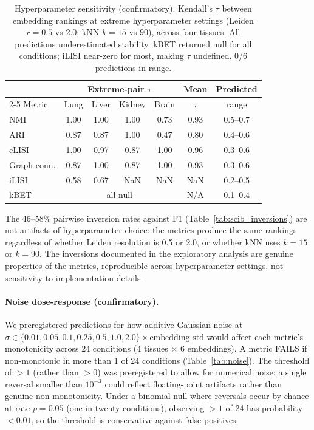 \documentclass[10pt,letterpaper]{article}
\begin{document}
\begin{table}[t]
\centering
\caption{Hyperparameter sensitivity (confirmatory). Kendall's $\tau$ between embedding rankings at extreme hyperparameter settings (Leiden $r = 0.5$ vs $2.0$; kNN $k = 15$ vs $90$), across four tissues. All predictions underestimated stability. kBET returned null for all conditions; iLISI near-zero for most, making $\tau$ undefined. 0/6 predictions in range.}
\label{tab:hyperparam}
\small
\begin{tabular}{@{}lcccccc@{}}
\toprule
 & \multicolumn{4}{c}{Extreme-pair $\tau$} & Mean & Predicted \\
\cmidrule(lr){2-5}
Metric & Lung & Liver & Kidney & Brain & $\bar{\tau}$ & range \\
\midrule
NMI & 1.00 & 1.00 & 1.00 & 0.73 & 0.93 & 0.5--0.7 \\
ARI & 0.87 & 0.87 & 1.00 & 0.47 & 0.80 & 0.4--0.6 \\
cLISI & 1.00 & 0.97 & 0.87 & 1.00 & 0.96 & 0.3--0.6 \\
Graph conn. & 0.87 & 1.00 & 0.87 & 1.00 & 0.93 & 0.3--0.6 \\
iLISI & 0.58 & 0.67 & NaN & NaN & NaN & 0.2--0.5 \\
kBET & \multicolumn{4}{c}{all null} & N/A & 0.1--0.4 \\
\bottomrule
\end{tabular}
\end{table}

The 46--58\% pairwise inversion rates against F1 (Table~\ref{tab:scib_inversions}) are not artifacts of hyperparameter choice: the metrics produce the same rankings regardless of whether Leiden resolution is 0.5 or 2.0, or whether kNN uses $k = 15$ or $k = 90$. The inversions documented in the exploratory analysis are genuine properties of the metrics, reproducible across hyperparameter settings, not sensitivity to implementation details.

\paragraph{Noise dose-response (confirmatory).} We preregistered predictions for how additive Gaussian noise at $\sigma \in \{0.01, 0.05, 0.1, 0.25, 0.5, 1.0, 2.0\} \times \text{embedding\_std}$ would affect each metric's monotonicity across 24 conditions (4 tissues $\times$ 6 embeddings). A metric FAILS if non-monotonic in more than 1 of 24 conditions (Table~\ref{tab:noise}). The threshold of $>1$ (rather than $>0$) was preregistered to allow for numerical noise: a single reversal smaller than $10^{-3}$ could reflect floating-point artifacts rather than genuine non-monotonicity. Under a binomial null where reversals occur by chance at rate $p = 0.05$ (one-in-twenty conditions), observing $>1$ of 24 has probability $< 0.01$, so the threshold is conservative against false positives.
\end{document}
